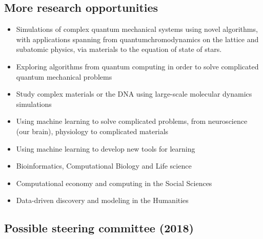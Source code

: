 \documentclass[%
oneside,                 %
final,                   %
10pt]{article}
\begin{document}
\noindent
\subsection*{More research opportunities}

\begin{itemize}
\item Simulations of complex quantum mechanical systems using novel algorithms, with applications spanning from quantumchromodynamics on the lattice and subatomic physics, via materials to the equation of state of stars.

\item Exploring algorithms from quantum computing in order to solve complicated quantum mechanical problems

\item Study complex materials or the DNA using large-scale molecular dynamics simulations

\item Using machine learning to solve complicated problems, from  neuroscience (our brain), physiology to complicated materials 

\item Using machine learning to develop new tools for learning

\item Bioinformatics, Computational Biology  and Life science

\item Computational economy and computing in the Social Sciences 

\item Data-driven discovery and modeling in  the Humanities
\end{itemize}

\noindent
\subsection*{Possible steering committee (2018)}
\end{document}
